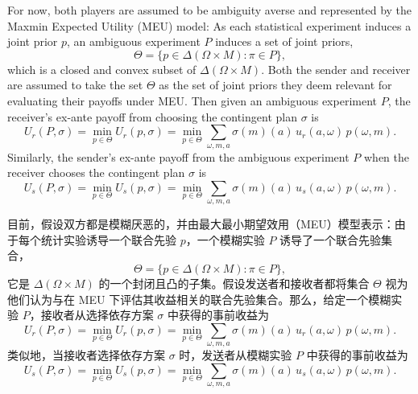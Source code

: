 \documentclass[12pt,a4paper]{article}
\theoremstyle{definition}
\theoremstyle{remark}
\newenvironment{original}{%
    \par\medskip\noindent%
    \begin{tcolorbox}[%
        colback=white,%
        colframe=black!50,%
        title=\textbf{Original English},%
        fonttitle=\small\bfseries,%
        left=0pt, right=0pt, top=2pt, bottom=2pt,%
        boxrule=0.5pt,%
        arc=0pt,%
        outer arc=0pt%
    ]%
    \small%
}{%
    \end{tcolorbox}%
}
\newenvironment{translation}{%
    \par\smallskip\noindent%
    \begin{tcolorbox}[%
        colback=blue!3!white,%
        colframe=blue!40!black,%
        title=\textbf{中文翻译},%
        fonttitle=\small\bfseries,%
        left=0pt, right=0pt, top=2pt, bottom=2pt,%
        boxrule=0.5pt,%
        arc=0pt,%
        outer arc=0pt%
    ]%
    \small\color{blue!60!black}%
}{%
    \end{tcolorbox}\medskip%
}
\begin{document}
\begin{original}
For now, both players are assumed to be ambiguity averse and represented by the Maxmin Expected Utility (MEU) model: As each statistical experiment induces a joint prior $p$, an ambiguous experiment $P$ induces a set of joint priors,
\[
\Theta = \{ p \in \Delta(\Omega \times M) : \pi \in P \},
\]
which is a closed and convex subset of $\Delta(\Omega \times M)$. Both the sender and receiver are assumed to take the set $\Theta$ as the set of joint priors they deem relevant for evaluating their payoffs under MEU. Then given an ambiguous experiment $P$, the receiver's ex-ante payoff from choosing the contingent plan $\sigma$ is
\[
U_r(P, \sigma) = \min_{p \in \Theta} U_r(p, \sigma) = \min_{p \in \Theta} \sum_{\omega, m, a} \sigma(m)(a) \, u_r(a, \omega) \, p(\omega, m).
\]
Similarly, the sender's ex-ante payoff from the ambiguous experiment $P$ when the receiver chooses the contingent plan $\sigma$ is
\[
U_s(P, \sigma) = \min_{p \in \Theta} U_s(p, \sigma) = \min_{p \in \Theta} \sum_{\omega, m, a} \sigma(m)(a) \, u_s(a, \omega) \, p(\omega, m).
\]
\end{original}
\begin{translation}
目前，假设双方都是模糊厌恶的，并由最大最小期望效用（MEU）模型表示：由于每个统计实验诱导一个联合先验 $p$，一个模糊实验 $P$ 诱导了一个联合先验集合，
\[
\Theta = \{ p \in \Delta(\Omega \times M) : \pi \in P \},
\]
它是 $\Delta(\Omega \times M)$ 的一个封闭且凸的子集。假设发送者和接收者都将集合 $\Theta$ 视为他们认为与在 MEU 下评估其收益相关的联合先验集合。那么，给定一个模糊实验 $P$，接收者从选择依存方案 $\sigma$ 中获得的事前收益为
\[
U_r(P, \sigma) = \min_{p \in \Theta} U_r(p, \sigma) = \min_{p \in \Theta} \sum_{\omega, m, a} \sigma(m)(a) \, u_r(a, \omega) \, p(\omega, m).
\]
类似地，当接收者选择依存方案 $\sigma$ 时，发送者从模糊实验 $P$ 中获得的事前收益为
\[
U_s(P, \sigma) = \min_{p \in \Theta} U_s(p, \sigma) = \min_{p \in \Theta} \sum_{\omega, m, a} \sigma(m)(a) \, u_s(a, \omega) \, p(\omega, m).
\]
\end{translation}
\end{document}
